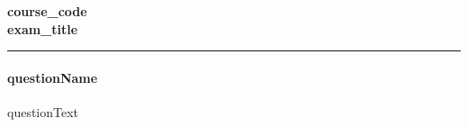 \documentclass[11pt]{article}
\newif\ifsolutions
\newcommand{\coursecode}{{{course_code}}}
\newcommand{\examtitle}{{{exam_title}}}
\newcommand{\docdate}{{{doc_date}}}
\begin{document}
\ifsolutions
\begin{center}
\Large\bf\coursecode\\[2pt] \examtitle ~Solutions \\ \large\docdate
\end{center}
\paragraph{Important Note:} Do not distribute or share these solutions. Any violations will be referred to the Office of Student Conduct.
\\
\else 
\begin{center}
\Large\bf\coursecode\\[2pt] \examtitle \\
\end{center}
\fi
\hrule

\paragraph{{{questionName}}}
{{questionText}}

\vspace{0.2 in}
\end{document}
